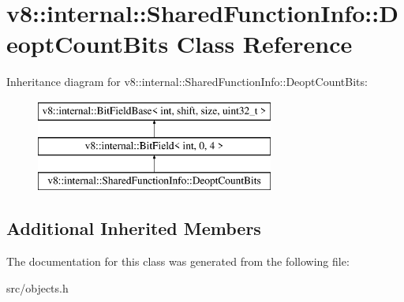 \hypertarget{classv8_1_1internal_1_1_shared_function_info_1_1_deopt_count_bits}{}\section{v8\+:\+:internal\+:\+:Shared\+Function\+Info\+:\+:Deopt\+Count\+Bits Class Reference}
\label{classv8_1_1internal_1_1_shared_function_info_1_1_deopt_count_bits}
Inheritance diagram for v8\+:\+:internal\+:\+:Shared\+Function\+Info\+:\+:Deopt\+Count\+Bits\+:\begin{figure}[H]
\begin{center}
\leavevmode
\includegraphics[height=3.000000cm]{classv8_1_1internal_1_1_shared_function_info_1_1_deopt_count_bits}
\end{center}
\end{figure}
\subsection*{Additional Inherited Members}


The documentation for this class was generated from the following file\+:\begin{DoxyCompactItemize}
\item 
src/objects.\+h\end{DoxyCompactItemize}
